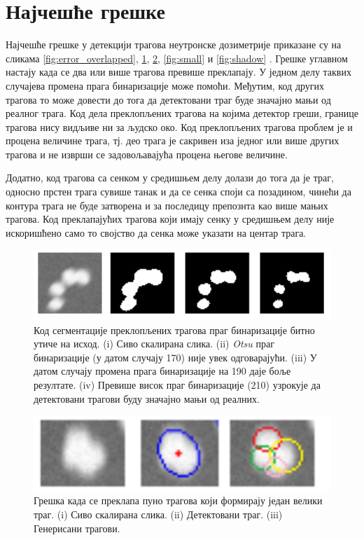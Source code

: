 \documentclass[11pt,a4paper,serbian,oneside]{book}
\begin{document}
\section{Најчешће грешке}

Најчешће грешке у детекцији трагова неутронске дозиметрије приказане су на сликама \ref{fig:error_overlapped}, \ref{fig:binthresh}, \ref{fig:multi}, \ref{fig:small} и \ref{fig:shadow} . Грешке углавном настају када се два или више  трагова превише преклапају. У једном делу таквих случајева промена прага бинаризације може помоћи. Међутим, код других трагова то може довести до тога да детектовани траг буде значајно мањи од реалног трага. Код дела преклопљених трагова на којима детектор греши, границе трагова нису видљиве ни за људско око. Код преклопљених трагова проблем је и процена величине трага, тј. део трага је сакривен иза једног или више других трагова и не изврши се задовољавајућа процена његове величине.

Додатно, код трагова са сенком у средишњем делу долази до тога да је траг, односно прстен трага сувише танак и да се сенка споји са позадином, чинећи да контура трага не буде затворена и за последицу препознта као више мањих трагова. Код преклапајућих трагова који имају сенку у средишњем делу није искоришћено само то својство да сенка може указати на центар трага. 


\begin{figure}[H]
\begin{center}
\includegraphics[width=150mm]{images/binthresh.png}
\end{center}
\caption{Код сегментације преклопљених трагова праг бинаризације битно утиче на исход. (i) Сиво скалирана слика. (ii) \textit{Otsu}  праг бинаризације (у датом случају 170) није увек одговарајући. (iii) У датом случају промена прага бинаризације на 190 даје боље резултате. (iv) Превише висок праг бинаризације (210) узрокује да детектовани трагови буду значајно мањи од реалних. }
\label{fig:binthresh}
\end{figure}

\begin{figure}[H]
\begin{center}
\includegraphics[width=150mm]{images/multi.png}
\end{center}
\caption{Грешка када се преклапа пуно трагова који формирају један велики траг. (i) Сиво скалирана слика. (ii) Детектовани траг.  (iii) Генерисани трагови. }
\label{fig:multi}
\end{figure}
\end{document}
